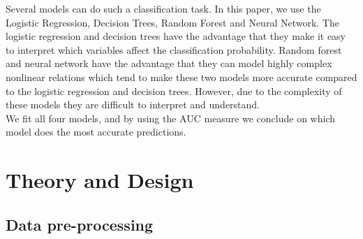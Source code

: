 Several models can do such a classification task. In this paper, we use the Logistic Regression, Decision Trees, Random Forest and Neural Network.
The logistic regression and decision trees have the advantage that they make it easy to interpret which variables affect the classification probability. Random forest and neural network have the advantage that they can model highly complex nonlinear relations which tend to make these two models more accurate compared to the logistic regression and decision trees. However, due to the complexity of these models they are difficult to interpret and understand.\\
We fit all four models, and by using the AUC measure we conclude on which model does the most accurate predictions.
\\
    \newpage
    \pagestyle{fancy}
    \section{Theory and Design}
    \subsection{Data pre-processing}
